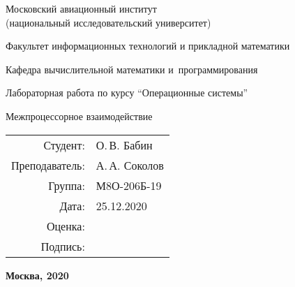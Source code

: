 \begin{titlepage}
\begin{center}
\bfseries

{\Large Московский авиационный институт\\ (национальный исследовательский университет)}

\vspace{48pt}

{\large Факультет информационных технологий и прикладной математики
}

{\large Кафедра вычислительной математики и~программирования}


\vspace{48pt}

Лабораторная работа  по курсу \enquote{Операционные системы}

\vspace{24pt}

{\Large Межпроцессорное взаимодействие}

\end{center}

\vspace{72pt}

\begin{flushright}
\begin{tabular}{rl}
Студент: & О.\,В. Бабин \\
Преподаватель: & А.\,А. Соколов  \\
Группа: & М8О-206Б-19 \\
Дата: & 25.12.2020 \\
Оценка: & \\
Подпись: & \\
\end{tabular}
\end{flushright}

\vfill

\begin{center}
\bfseries
Москва, 2020
\end{center}
\end{titlepage}

\pagebreak
